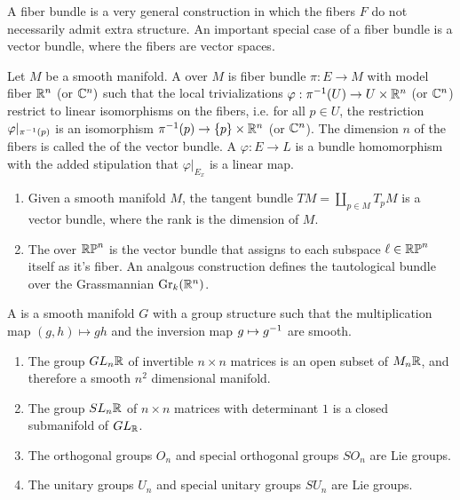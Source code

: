%
A fiber bundle is a very general construction in which the fibers $F$ do
not necessarily admit extra structure. An important special case of a fiber bundle
is a vector bundle, where the fibers are vector spaces.
%
\begin{defn}
Let $M$ be a smooth manifold. A  over $M$ is fiber bundle
$\pi : E \to M$ with model fiber $\mathbb{R}^n$ (or $\mathbb{C}^n)$ such that the local
trivializations $\varphi : \pi^{-1}(U) \to U \times \mathbb{R}^n$ (or $\mathbb{C}^n$)
restrict to linear isomorphisms on the fibers, i.e. for all $p \in U$, the restriction
$\varphi\vert_{\pi^{-1}(p)}$ is an isomorphism $\pi^{-1}(p) \to \left\lbrace p \right\rbrace \times \mathbb{R}^n$
(or $\mathbb{C}^n$). The dimension $n$ of the fibers is called the  of the
vector bundle. A  $\varphi : E \to L$ is a bundle
homomorphism with the added stipulation that $\varphi\vert_{E_x}$ is a linear
map.
\end{defn}
%
\begin{exmp} \enumbreak
\begin{enumerate}
  \item Given a smooth manifold $M$, the tangent bundle $TM = \coprod_{p \in M} T_pM$
  is a vector bundle, where the rank is the dimension of $M$.
  \item The  over $\mathbb{RP}^n$ is the vector bundle that
  assigns to each subspace $\ell \in \mathbb{RP}^n$ itself as it's fiber. An analgous
  construction defines the tautological bundle over the Grassmannian
  $\mathrm{Gr}_k(\mathbb{R}^n)$.
\end{enumerate}
\end{exmp}
%
\begin{defn}
A  is a smooth manifold $G$ with a group structure such that the
multiplication map $(g,h) \mapsto gh$ and the inversion map $g \mapsto g^{-1}$
are smooth.
\end{defn}
%
\begin{exmp} \enumbreak
\begin{enumerate}
  \item The group $GL_n\mathbb{R}$ of invertible $n \times n$ matrices is an open
  subset of $M_n\mathbb{R}$, and therefore a smooth $n^2$ dimensional manifold.
  \item The group $SL_n\mathbb{R}$ of $n\times n$ matrices with determinant $1$ is a
  closed submanifold of $GL_{\mathbb{R}}$.
  \item The orthogonal groups $O_n$ and special orthogonal groups $SO_n$ are Lie groups.
  \item The unitary groups $U_n$ and special unitary groups $SU_n$ are Lie groups.
\end{enumerate}
\end{exmp}
